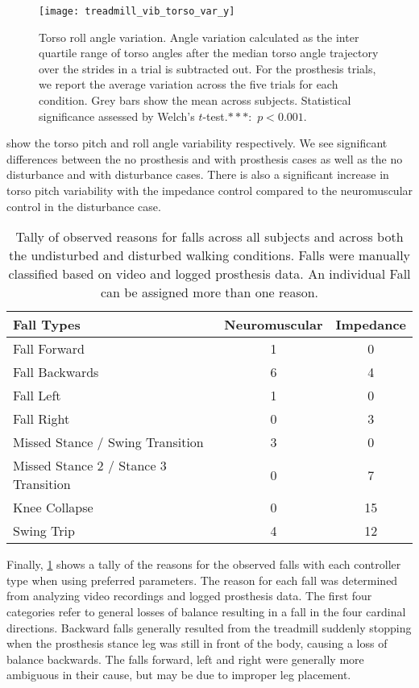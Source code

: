 \begin{figure}[t]
    \centering 
    \texttt{[image: treadmill\_vib\_torso\_var\_y]}
    \caption{Torso roll angle variation. Angle variation calculated as the inter
    quartile range of torso angles after the median torso angle trajectory over
    the strides in a trial is subtracted out. For the prosthesis trials, we
    report the average variation across the five trials for each condition.
    Grey bars show the mean across subjects.  Statistical significance assessed
    by Welch's $t$-test.$***$:~$p < 0.001$.}\label{fig:treadmill_exp_torso_var_y}
\end{figure}

 show the
torso pitch and roll angle variability respectively. We see significant
differences between the no prosthesis and with prosthesis cases as well as the
no disturbance and with disturbance cases. There is also a significant increase
in torso pitch variability with the impedance control compared to the
neuromuscular control in the disturbance case.

\begin{table}[t]
  \begin{center}
    \begin{tabular}{lcc}
      Fall Types & Neuromuscular & Impedance \\
      \midrule
      Fall Forward &  1 &  0 \\
      Fall Backwards &  6 &  4 \\
      Fall Left &  1 &  0 \\
      Fall Right &  0 &  3 \\
      Missed Stance / Swing Transition &  3 &  0 \\
      Missed Stance 2 / Stance 3 Transition &  0 &  7 \\
      Knee Collapse & 0 & 15 \\
      Swing Trip & 4 & 12 \\
    \end{tabular}
  \end{center}
  \caption{Tally of observed reasons for falls across all subjects and across
  both the undisturbed and disturbed walking conditions. Falls were manually
  classified based on video and logged prosthesis data. An individual Fall can
  be assigned more than one reason.}\label{tab:treadmill_exp_fall_reasons}
\end{table}
Finally, \cref{tab:treadmill_exp_fall_reasons} shows a tally of the reasons for
the observed falls with each controller type when using preferred parameters.
The reason for each fall was determined from analyzing video recordings and
logged prosthesis data. The first four categories refer to general losses of
balance resulting in a fall in the four cardinal directions. Backward falls
generally resulted from the treadmill suddenly stopping when the prosthesis
stance leg was still in front of the body, causing a loss of balance backwards.
The falls forward, left and right were generally more ambiguous in their cause,
but may be due to improper leg placement. 

